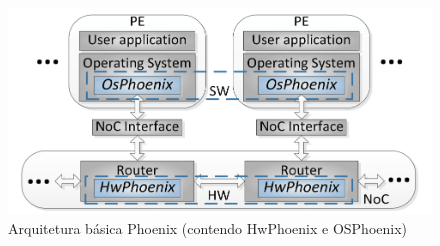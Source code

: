 \documentclass[conference]{IEEEtran}
\begin{document}
	\begin{figure}[htbp]
		\centerline{\includegraphics[scale=0.365]{fig1.jpg}}
		\caption{Arquitetura básica Phoenix (contendo HwPhoenix e OSPhoenix)}
		\label{ArquiteturaBasica}
	\end{figure}
	
\end{document}
